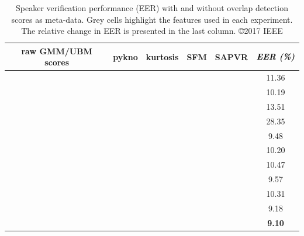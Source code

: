 \begin{table}[t]
	\centering
	\caption{ Speaker verification performance (EER) with and without overlap detection scores as meta-data. Grey cells highlight the features used in each experiment. The relative change in EER is presented in the last column. \copyright 2017 IEEE}
	\begin{tabular}{|c|c|c|c|c|c|}
		\hline
		raw GMM/UBM scores & pykno & kurtosis & SFM & SAPVR & $\textit{\textbf{EER (\%)}}$ \\ \hline
		\cellcolor[HTML]{C0C0C0}{\color[HTML]{343434} } \checkmark &  &  &  &  & 11.36\\ \hline \hline
		\cellcolor[HTML]{C0C0C0} \checkmark & \cellcolor[HTML]{C0C0C0} \checkmark &  &  &  & 10.19 \\ \hline
		\cellcolor[HTML]{C0C0C0} \checkmark &  & \cellcolor[HTML]{C0C0C0} \checkmark &  &  & 13.51 \\ \hline
		\cellcolor[HTML]{C0C0C0}{\color[HTML]{343434} } \checkmark &  &  & \cellcolor[HTML]{C0C0C0}{\color[HTML]{343434} } \checkmark &  & 28.35 \\ \hline
		\cellcolor[HTML]{C0C0C0} \checkmark &  &  &  & \cellcolor[HTML]{C0C0C0} \checkmark & 9.48 \\ \hline \hline
		\cellcolor[HTML]{C0C0C0}{\color[HTML]{343434} } \checkmark & \cellcolor[HTML]{C0C0C0} \checkmark & \cellcolor[HTML]{C0C0C0}{\color[HTML]{343434} } \checkmark &  &  & 10.20 \\ \hline
		\cellcolor[HTML]{C0C0C0} \checkmark & \cellcolor[HTML]{C0C0C0} \checkmark &  & \cellcolor[HTML]{C0C0C0} \checkmark &  & 10.47 \\ \hline
		\cellcolor[HTML]{C0C0C0} \checkmark & \cellcolor[HTML]{C0C0C0} \checkmark &  &  & \cellcolor[HTML]{C0C0C0} \checkmark & 9.57 \\ \hline \hline
		\cellcolor[HTML]{C0C0C0} \checkmark & \cellcolor[HTML]{C0C0C0} \checkmark & \cellcolor[HTML]{C0C0C0} \checkmark & \cellcolor[HTML]{C0C0C0} \checkmark &  & 10.31 \\ \hline
		\cellcolor[HTML]{C0C0C0} \checkmark & \cellcolor[HTML]{C0C0C0} \checkmark & \cellcolor[HTML]{C0C0C0} \checkmark & \cellcolor[HTML]{FFFFFF} & \cellcolor[HTML]{C0C0C0} \checkmark & 9.18 \\ \hline
		\cellcolor[HTML]{C0C0C0} \checkmark & \cellcolor[HTML]{C0C0C0} \checkmark & \cellcolor[HTML]{C0C0C0} \checkmark & \cellcolor[HTML]{C0C0C0} \checkmark & \cellcolor[HTML]{C0C0C0} \checkmark & {\bf 9.10}\\ \hline
	\end{tabular}
	\label{tab:ch3_sid_stack_results}
	\vspace{-5mm}
\end{table}

